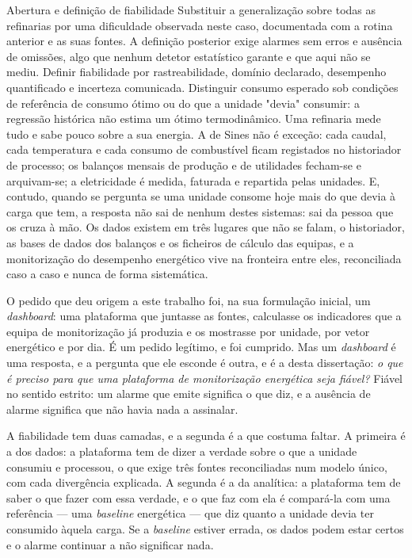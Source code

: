 {Abertura e definição de fiabilidade}
{Substituir a generalização sobre todas as refinarias por uma dificuldade
observada neste caso, documentada com a rotina anterior e as suas fontes.
A definição posterior exige alarmes sem erros e ausência de omissões,
algo que nenhum detetor estatístico garante e que aqui não se mediu.
Definir fiabilidade por rastreabilidade, domínio declarado, desempenho
quantificado e incerteza comunicada. Distinguir consumo esperado sob
condições de referência de consumo ótimo ou do que a unidade "devia"
consumir: a regressão histórica não estima um ótimo termodinâmico.}%
Uma refinaria mede tudo e sabe pouco sobre a sua energia. A de Sines
não é exceção: cada caudal, cada temperatura e cada consumo de
combustível ficam registados no historiador de processo; os balanços
mensais de produção e de utilidades fecham-se e arquivam-se; a
eletricidade é medida, faturada e repartida pelas unidades. E, contudo,
quando se pergunta se uma unidade consome hoje mais do que devia à carga
que tem, a resposta não sai de nenhum destes sistemas: sai da pessoa que
os cruza à mão.
Os dados existem em três lugares que não se falam, o
historiador, as bases de dados dos balanços e os ficheiros de cálculo
das equipas, e a monitorização do desempenho energético vive na
fronteira entre eles, reconciliada caso a caso e nunca de forma
sistemática.

O pedido que deu origem a este trabalho foi, na sua formulação inicial,
um \emph{dashboard}: uma plataforma que juntasse as fontes, calculasse
os indicadores que a equipa de monitorização já produzia e os mostrasse
por unidade, por vetor energético e por dia. É um pedido legítimo, e foi
cumprido. Mas um \emph{dashboard} é uma resposta, e a pergunta que ele
esconde é outra, e é a desta dissertação: \emph{o que é preciso para que
uma plataforma de monitorização energética seja fiável?} Fiável no
sentido estrito: um alarme que emite significa o que diz, e a ausência
de alarme significa que não havia nada a assinalar.

A fiabilidade tem duas camadas, e a segunda é a que costuma faltar. A
primeira é a dos dados: a plataforma tem de dizer a verdade sobre o que
a unidade consumiu e processou, o que exige três fontes reconciliadas
num modelo único, com cada divergência explicada. A segunda é a da
analítica: a plataforma tem de saber o que fazer com essa verdade, e o
que faz com ela é compará-la com uma referência --- uma \emph{baseline}
energética --- que diz quanto a unidade devia ter consumido àquela
carga. Se a \emph{baseline} estiver errada, os dados podem estar certos
e o alarme continuar a não significar nada.


